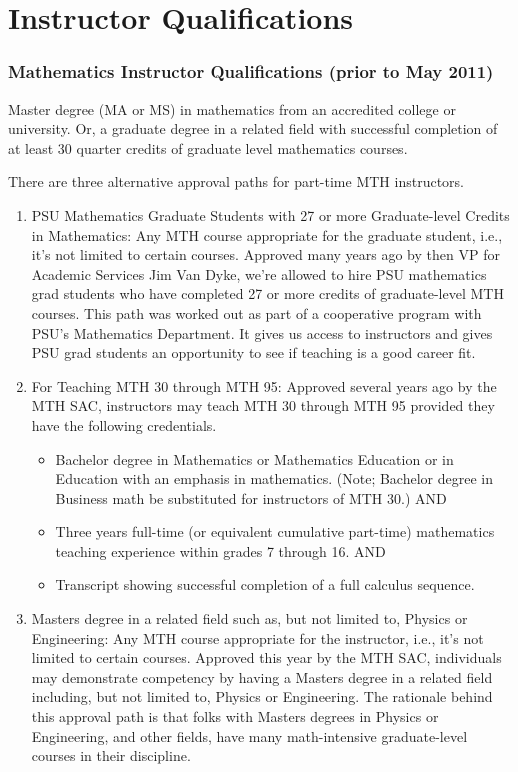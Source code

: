 \chapter{Instructor Qualifications}\label{app:sec:instructorquals}
\subsection{Mathematics Instructor Qualifications (prior to May 2011)}
Master degree (MA or MS) in mathematics from an accredited college or university.  Or, a graduate degree in a related field with successful completion of at least 30 quarter credits of graduate level mathematics courses.

There are three alternative approval paths for part-time MTH instructors.
\begin{enumerate}
  \item PSU Mathematics Graduate Students with 27 or more Graduate-level Credits in Mathematics: Any MTH course appropriate for the graduate student, i.e., it's not limited to certain courses. Approved many years ago by then VP for Academic Services Jim Van Dyke, we're allowed to hire PSU mathematics grad students who have completed 27 or more credits of graduate-level MTH courses. This path was worked out as part of a cooperative program with PSU's Mathematics Department. It gives us access to instructors and gives PSU grad students an opportunity to see if teaching is a good career fit.
  \item For Teaching MTH 30 through MTH 95: Approved several years ago by the MTH SAC, instructors may teach MTH 30 through MTH 95 provided they have the following credentials.
    \begin{itemize}
      \item Bachelor degree in Mathematics or Mathematics Education or in Education with an emphasis in mathematics. (Note; Bachelor degree in Business math be substituted for instructors of MTH 30.)
        AND
      \item Three years full-time (or equivalent cumulative part-time) mathematics teaching experience within grades 7 through 16.
        AND
      \item Transcript showing successful completion of a full calculus sequence.
    \end{itemize}
  \item Masters degree in a related field such as, but not limited to, Physics or Engineering: Any MTH course appropriate for the instructor, i.e., it's not limited to certain courses. Approved this year by the MTH SAC, individuals may demonstrate competency by having a Masters degree in a related field including, but not limited to, Physics or Engineering. The rationale behind this approval path is that folks with Masters degrees in Physics or Engineering, and other fields, have many math-intensive graduate-level courses in their discipline.
\end{enumerate}

